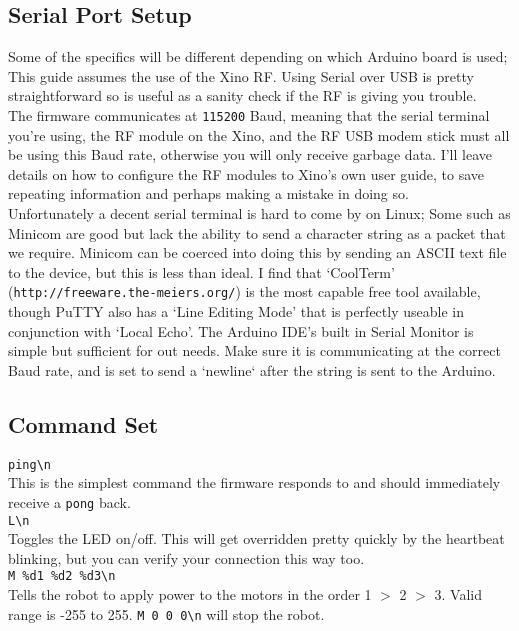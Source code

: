 \subsection{Serial Port Setup}

Some of the specifics will be different depending on which Arduino board is used; This guide assumes the use of the Xino RF. Using Serial over USB is pretty straightforward so is useful as a sanity check if the RF is giving you trouble.\\

The firmware communicates at \texttt{115200} Baud, meaning that the serial terminal you're using, the RF module on the Xino, and the RF USB modem stick must all be using this Baud rate, otherwise you will only receive garbage data. I'll leave details on how to configure the RF modules to Xino's own user guide, to save repeating information and perhaps making a mistake in doing so.\\

Unfortunately a decent serial terminal is hard to come by on Linux; Some such as Minicom are good but lack the ability to send a character string as a packet that we require. Minicom can be coerced into doing this by sending an ASCII text file to the device, but this is less than ideal. I find that `CoolTerm' (\texttt{http://freeware.the-meiers.org/}) is the most capable free tool available, though PuTTY also has a `Line Editing Mode' that is perfectly useable in conjunction with `Local Echo'. The Arduino IDE's built in Serial Monitor is simple but sufficient for out needs. Make sure it is communicating at the correct Baud rate, and is set to send a `newline` after the string is sent to the Arduino.

\subsection{Command Set}


\verb|ping\n|\\
This is the simplest command the firmware responds to and should immediately receive a \verb|pong| back.\\


\verb|L\n|\\
Toggles the LED on/off. This will get overridden pretty quickly by the heartbeat blinking, but you can verify your connection this way too.\\


\verb|M %d1 %d2 %d3\n|\\
Tells the robot to apply power to the motors in the order 1 $>$ 2 $>$ 3. Valid range is -255 to 255. \verb|M 0 0 0\n| will stop the robot.

